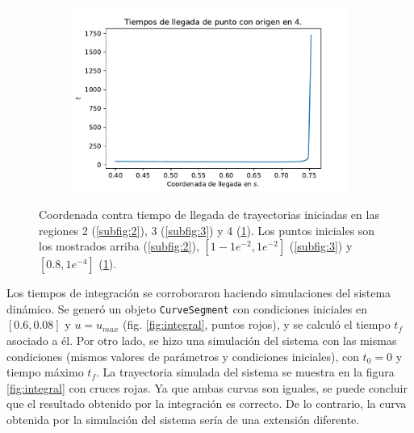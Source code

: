 \documentclass{article}
\begin{document}
\begin{figure}
\begin{subfigure}{0.5\textwidth}
	\includegraphics[width = \textwidth]{tiempos_4.pdf}
	\caption{}
	\label{subfig:4}
\end{subfigure}
\caption{Coordenada contra tiempo de llegada de trayectorias iniciadas en las regiones 2 (\ref{subfig:2}), 3 (\ref{subfig:3}) y 4 (\ref{subfig:4}). Los puntos iniciales son los mostrados arriba (\ref{subfig:2}), $[1 - 1e^{-2}, 1e^{-2}]$ (\ref{subfig:3}) y $[0.8, 1e^{-4}]$ (\ref{subfig:4}).}
\label{fig:times}
\end{figure}

Los tiempos de integración se corroboraron haciendo simulaciones del sistema dinámico. Se generó un objeto \texttt{CurveSegment} con condiciones iniciales en $[0.6, 0.08]$ y $u = u_{max}$ (fig. \ref{fig:integral}, puntos rojos), y se calculó el tiempo $t_f$ asociado a él. Por otro lado, se hizo una simulación del sistema con las mismas condiciones (mismos valores de parámetros y condiciones iniciales), con $t_0 = 0$ y tiempo máximo $t_f$. La trayectoria simulada del sistema se muestra en la figura \ref{fig:integral} con cruces rojas. Ya que ambas curvas son iguales, se puede concluir que el resultado obtenido por la integración es correcto. De lo contrario, la curva obtenida por la simulación del sistema sería de una extensión diferente.
\end{document}
